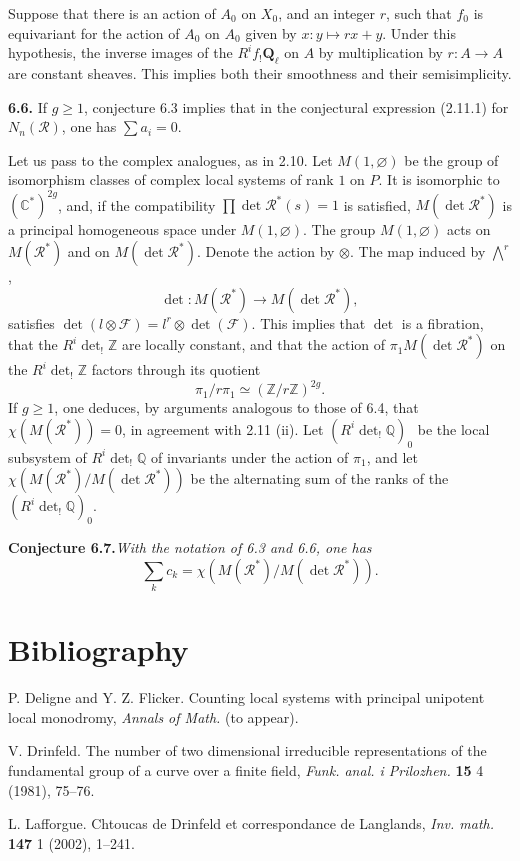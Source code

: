 \documentclass[11pt]{article}
\newcommand{\Ql}{\mathbf{Q}_{\ell}}
\newcommand{\Q}{\mathbb{Q}}
\newcommand{\Z}{\mathbb{Z}}
\newcommand{\C}{\mathbb{C}}
\newcommand{\para}[1]{\medskip\noindent\textbf{#1}\enspace}
\begin{document}
Suppose that there is an action of \(A_0\) on \(X_0\), and an integer \(r\), such that \(f_0\) is equivariant for the action of \(A_0\) on \(A_0\) given by \(x:y\mapsto rx+y\). Under this hypothesis, the inverse images of the \(R^if_!\Ql\) on \(A\) by multiplication by \(r:A\to A\) are constant sheaves. This implies both their smoothness and their semisimplicity.

\para{6.6.} If \(g\geq 1\), conjecture 6.3 implies that in the conjectural expression (2.11.1) for \(N_n(\mathcal R)\), one has \(\sum a_i=0\).

Let us pass to the complex analogues, as in 2.10. Let \(M(1,\varnothing)\) be the group of isomorphism classes of complex local systems of rank \(1\) on \(P\). It is isomorphic to \((\C^*)^{2g}\), and, if the compatibility \(\prod\det \mathcal R^*(s)=1\) is satisfied, \(M(\det\mathcal R^*)\) is a principal homogeneous space under \(M(1,\varnothing)\). The group \(M(1,\varnothing)\) acts on \(M(\mathcal R^*)\) and on \(M(\det\mathcal R^*)\). Denote the action by \(\otimes\). The map induced by \(\bigwedge^r\),
\[
  \det:M(\mathcal R^*)\longrightarrow M(\det\mathcal R^*),
\]
satisfies \(\det(l\otimes\mathcal F)=l^r\otimes\det(\mathcal F)\). This implies that \(\det\) is a fibration, that the \(R^i\det_!\Z\) are locally constant, and that the action of \(\pi_1M(\det\mathcal R^*)\) on the \(R^i\det_!\Z\) factors through its quotient
\[
  \pi_1/r\pi_1\simeq(\Z/r\Z)^{2g}.
\]
If \(g\geq 1\), one deduces, by arguments analogous to those of 6.4, that \(\chi(M(\mathcal R^*))=0\), in agreement with 2.11 (ii). Let \((R^i\det_!\Q)_0\) be the local subsystem of \(R^i\det_!\Q\) of invariants under the action of \(\pi_1\), and let \(\chi(M(\mathcal R^*)/M(\det\mathcal R^*))\) be the alternating sum of the ranks of the \((R^i\det_!\Q)_0\).

\noindent\textbf{Conjecture 6.7.}\quad\textit{With the notation of 6.3 and 6.6, one has}
\[
  \sum_k c_k=\chi(M(\mathcal R^*)/M(\det\mathcal R^*)).
\]

\section*{Bibliography}

\begin{description}[leftmargin=2.6em,labelwidth=2.1em,labelsep=0.5em]
\item[{[DF]}] P. Deligne and Y. Z. Flicker. Counting local systems with principal unipotent local monodromy, \emph{Annals of Math.} (to appear).

\item[{[Dr]}] V. Drinfeld. The number of two dimensional irreducible representations of the fundamental group of a curve over a finite field, \emph{Funk. anal. i Prilozhen.} \textbf{15} 4 (1981), 75--76.

\item[{[L]}] L. Lafforgue. Chtoucas de Drinfeld et correspondance de Langlands, \emph{Inv. math.} \textbf{147} 1 (2002), 1--241.
\end{description}
\end{document}
